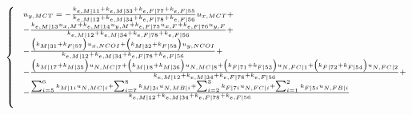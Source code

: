\documentclass[a4paper]{jpconf}
\begin{document}
\begin{equation}
\scriptsize
\begin{cases}
&u_{y,MCT}=-\frac{k_{e,M|11}+k_{e,M|33}+k_{e,F|77}+k_{e,F|55}}{k_{e,M|12}+k_{e,M|34}+k_{e,F|78}+k_{e,F|56}}u_{x,MCT}+\\
&-\frac{k_{e,M|13}u_{x,M}+k_{e,M|14}u_{y,M}+k_{e,F|75}u_{x,F}+k_{e,F|76}u_{y,F}}{k_{e,M|12}+k_{e,M|34}+k_{e,F|78}+k_{e,F|56}}+\\
&-\frac{\left(k_{M|31}+k_{F|57}\right)u_{x,NCOI}+\left(k_{M|32}+k_{F|58}\right)u_{y,NCOI}}{k_{e,M|12}+k_{e,M|34}+k_{e,F|78}+k_{e,F|56}}+\\
&-\frac{\left(k_{M|17}+k_{M|35}\right)u_{N,MC|7}+\left(k_{M|18}+k_{M|36}\right)u_{N,MC|8}+\left(k_{F|71}+k_{F|53}\right)u_{N,FC|1}+\left(k_{F|72}+k_{F|54}\right)u_{N,FC|2}}{k_{e,M|12}+k_{e,M|34}+k_{e,F|78}+k_{e,F|56}}+\\
&-\frac{\sum_{i=5}^{6}k_{M|1i}u_{N,MC|i}+\sum_{i=7}^{8}k_{M|3i}u_{N,MB|i}+\sum_{i=2}^{3}k_{F|7i}u_{N,FC|i}+\sum_{i=1}^{2}k_{F|5i}u_{N,FB|i}}{k_{e,M|12}+k_{e,M|34}+k_{e,F|78}+k_{e,F|56}}\\[10pt]


\end{cases}
\end{equation}
\end{document}
